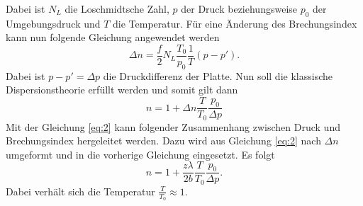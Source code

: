 Dabei ist $N_L$ die Loschmidtsche Zahl, $p$ der Druck beziehungsweise $p_0$ der Umgebungsdruck und
$T$ die Temperatur.
Für eine Änderung des Brechungsindex kann nun folgende Gleichung angewendet werden
\begin{equation*}
  \Delta n = \frac{f}{2} N_L \frac{T_0}{p_0}\frac{1}{T} (p-p').
\end{equation*}
Dabei ist $p-p'=\Delta p$ die Druckdifferenz der Platte.
Nun soll die klassische Dispersionstheorie erfüllt werden und somit gilt dann
\begin{equation*}
  n = 1 + \Delta n \frac{T}{T_0} \frac{p_0}{\Delta p}
\end{equation*}
Mit der Gleichung \ref{eq:2} kann folgender Zusammenhang zwischen Druck und Brechungsindex
hergeleitet werden. Dazu wird aus Gleichung \ref{eq:2} nach $\Delta n$ umgeformt und
in die vorherige Gleichung eingesetzt. Es folgt
\begin{equation}
  n = 1 + \frac{z \lambda}{2b} \frac{T}{T_0} \frac{p_0}{\Delta p}.
  \label{eq:3}
\end{equation}
Dabei verhält sich die Temperatur $\frac{T}{T_0} \approx 1$.
